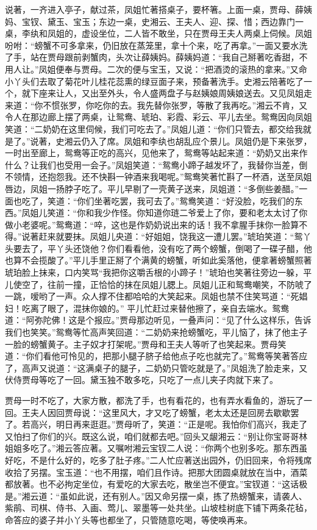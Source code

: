 \begin{parag}
    说著，一齐进入亭子，献过茶，凤姐忙著搭桌子，要杯箸。上面一桌，贾母、薛姨妈、宝钗、黛玉、宝玉；东边一桌，史湘云、王夫人、迎、探、惜；西边靠门一桌，李纨和凤姐的，虚设坐位，二人皆不敢坐，只在贾母王夫人两桌上伺候。凤姐吩咐：“螃蟹不可多拿来，仍旧放在蒸笼里，拿十个来，吃了再拿。”一面又要水洗了手，站在贾母跟前剥蟹肉，头次让薛姨妈。薛姨妈道：“我自己掰著吃香甜，不用人让。”凤姐便奉与贾母。二次的便与宝玉，又说：“把酒烫的滚热的拿来。”又命小丫头们去取了菊花叶儿桂花蕊熏的绿豆面子来，预备著洗手。史湘云陪著吃了一个，就下座来让人，又出至外头，令人盛两盘子与赵姨娘周姨娘送去。又见凤姐走来道：“你不惯张罗，你吃你的去。我先替你张罗，等散了我再吃。”湘云不肯，又令人在那边廊上摆了两桌，让鸳鸯、琥珀、彩霞、彩云、平儿去坐。鸳鸯因向凤姐笑道：“二奶奶在这里伺候，我们可吃去了。”凤姐儿道：“你们只管去，都交给我就是了。”说著，史湘云仍入了席。凤姐和李纨也胡乱应个景儿。凤姐仍是下来张罗，一时出至廊上，鸳鸯等正吃的高兴，见他来了，鸳鸯等站起来道：“奶奶又出来作什么？让我们也受用一会子。”凤姐笑道：“鸳鸯小蹄子越发坏了，我替你当差，倒不领情，还抱怨我。还不快斟一钟酒来我喝呢。”鸳鸯笑著忙斟了一杯酒，送至凤姐唇边，凤姐一扬脖子吃了。平儿早剔了一壳黄子送来，凤姐道：“多倒些姜醋。”一面也吃了，笑道：“你们坐著吃罢，我可去了。”鸳鸯笑道：“好没脸，吃我们的东西。”凤姐儿笑道：“你和我少作怪。你知道你琏二爷爱上了你，要和老太太讨了你做小老婆呢。”鸳鸯道：“啐，这也是作奶奶说出来的话！我不拿腥手抹你一脸算不得。”说著赶来就要抹。凤姐儿央道：“好姐姐，饶我这一遭儿罢。”琥珀笑道：“鸳丫头要去了，平丫头还饶他？你们看看他，没有吃了两个螃蟹，倒喝了一碟子醋，他也算不会揽酸了。”平儿手里正掰了个满黄的螃蟹，听如此奚落他，便拿著螃蟹照著琥珀脸上抹来，口内笑骂“我把你这嚼舌根的小蹄子！”琥珀也笑著往旁边一躲，平儿使空了，往前一撞，正恰恰的抹在凤姐儿腮上。凤姐儿正和鸳鸯嘲笑，不防唬了一跳，嗳哟了一声。众人撑不住都哈哈的大笑起来。凤姐也禁不住笑骂道：“死娼妇！吃离了眼了，混抹你娘的。” 平儿忙赶过来替他擦了，亲自去端水。鸳鸯道：“阿弥陀佛！这是个报应。”贾母那边听见，一叠声问：“见了什么这样乐，告诉我们也笑笑。”鸳鸯等忙高声笑回道：“二奶奶来抢螃蟹吃，平儿恼了，抹了他主子一脸的螃蟹黄子。主子奴才打架呢。”贾母和王夫人等听了也笑起来。贾母笑道：“你们看他可怜见的，把那小腿子脐子给他点子吃也就完了。”鸳鸯等笑著答应了，高声又说道：“这满桌子的腿子，二奶奶只管吃就是了。”凤姐洗了脸走来，又伏侍贾母等吃了一回。黛玉独不敢多吃，只吃了一点儿夹子肉就下来了。
\end{parag}


\begin{parag}
    贾母一时不吃了，大家方散，都洗了手，也有看花的，也有弄水看鱼的，游玩了一回。王夫人因回贾母说：“这里风大，才又吃了螃蟹，老太太还是回房去歇歇罢了。若高兴，明日再来逛逛。”贾母听了，笑道：“正是呢。我怕你们高兴，我走了又怕扫了你们的兴。既这么说，咱们就都去吧。”回头又龈湘云：“别让你宝哥哥林姐姐多吃了。”湘云答应著。又嘱咐湘云宝钗二人说：“你两个也别多吃。那东西虽好吃，不是什么好的，吃多了肚子疼。”二人忙应著送出园外，仍旧回来，令将残席收拾了另摆。宝玉道：“也不用摆，咱们且作诗。把那大团圆桌就放在当中，酒菜都放著。也不必拘定坐位，有爱吃的大家去吃，散坐岂不便宜。”宝钗道：“这话极是。”湘云道：“虽如此说，还有别人。”因又命另摆一桌，拣了热螃蟹来，请袭人、紫鹃、司棋、侍书、入画、莺儿、翠墨等一处共坐。山坡桂树底下铺下两条花毡，命答应的婆子并小丫头等也都坐了，只管随意吃喝，等使唤再来。
\end{parag}



